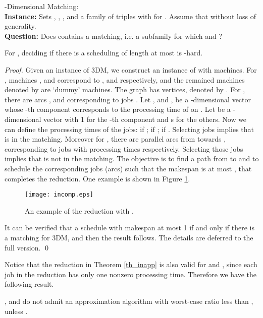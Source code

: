 \documentclass{llncs}
\numberwithin{subcase}{case}
\begin{document}
{-Dimensional Matching}:\\
{\bf Instance:} Sets , , , and a family  of triples with  for . Assume that  without loss of generality.\\
{\bf Question:} Does  contains a matching, i.e. a subfamily  for which  and ?

\begin{theorem}
For , deciding if there is a scheduling of length at most  is -hard. \label{th_inapp}
\end{theorem}
\begin{proof}
Given an instance of 3DM, we construct an instance of  with  machines. For , machines ,  and  correspond to ,  and  respectively, and the remained  machines denoted by  are `dummy' machines. The graph has  vertices, denoted by . For , there are arcs ,  and corresponding to jobs . Let ,  and , be a -dimensional vector whose -th component corresponds to the processing time of  on . Let  be a -dimensional vector with 1 for the -th component and s for the others. Now we can define the processing times of the jobs:  if ;  if ;  if . Selecting jobs  implies that  is in the matching. Moreover for , there are  parallel arcs from  towards , corresponding to jobs  with processing times  respectively. Selecting those jobs implies that  is not in the matching. The objective is to find a path from  to  and to schedule the corresponding jobs (arcs) such that the makespan is at most , that completes the reduction. One example is shown in Figure \ref{fig_inapp_2}.

\begin{figure}[ht]
  \centering
  \texttt{[image: incomp.eps]}\\
  \caption{An example of the reduction with .}\label{fig_inapp_2}
\end{figure}

It can be verified that a schedule with makespan at most 1 if and only if there is a matching for 3DM, and then the result follows. The details are deferred to the full version.
\qed
\end{proof}

Notice that the reduction in Theorem \ref{th_inapp} is also valid for  and , since each job in the reduction has only one nonzero processing time. Therefore we have the following result.
\begin{corollary}
,  and  do not admit an approximation algorithm with worst-case ratio less than , unless .
\end{corollary}
\end{document}
